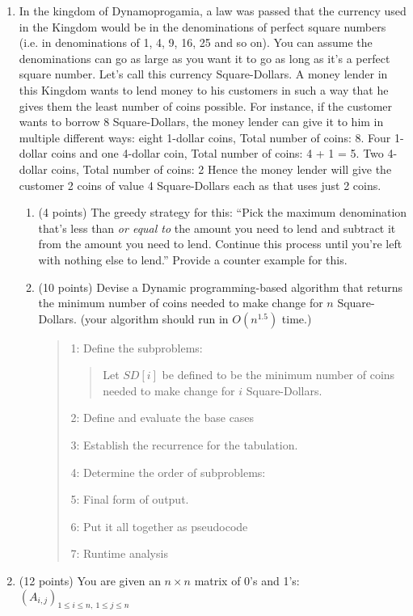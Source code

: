 \documentclass[10pt,letterpaper,unboxed,cm]{article}
\begin{document}
\begin{enumerate}
\item
In the kingdom of Dynamoprogamia, a law was passed that the currency
used in the Kingdom would be in the denominations of perfect square numbers (i.e. in
denominations of 1, 4, 9, 16, 25 and so on). You can assume the denominations can go
as large as you want it to go as long as it’s a perfect square number. Let’s call this
currency Square-Dollars.
A money lender in this Kingdom wants to lend money to his customers in such a way
that he gives them the least number of coins possible. For instance, if the customer
wants to borrow 8 Square-Dollars, the money lender can give it to him in multiple
different ways:
eight 1-dollar coins, Total number of coins: 8.
Four 1-dollar coins and one 4-dollar coin, Total number of coins: 4 + 1 = 5.
Two 4-dollar coins, Total number of coins: 2
Hence the money lender will give the customer 2 coins of value 4 Square-Dollars each
as that uses just 2 coins.
\begin{enumerate}
\item (4 points)
The greedy strategy for this: “Pick the maximum denomination that’s less than \emph{or equal to}
the amount you need to lend and subtract it from the amount you need to lend.
Continue this process until you’re left with nothing else to lend.” Provide a counter example for this.
\item (10 points)
Devise a Dynamic programming-based algorithm that returns the minimum number of coins needed to make change for $n$ Square-Dollars. (your algorithm should run in $O(n^{1.5})$ time.)


\begin{quote}
1: Define the subproblems:
\begin{quote}
Let $SD[i]$ be defined to be the minimum number of coins needed to make change for $i$ Square-Dollars.
\end{quote}

2: Define and evaluate the base cases

3: Establish the recurrence for the tabulation.

4: Determine the order of subproblems:

5: Final form of output.

6: Put it all together as pseudocode

7: Runtime analysis


\end{quote}
\end{enumerate}

\item (12 points)
You are given an $n\times n$ matrix of 0's and 1's: $(A_{i,j})_{1\leq i \leq n,~1\leq j \leq n}$


\end{enumerate}
\end{document}
